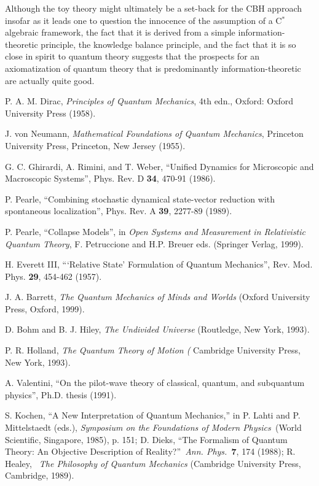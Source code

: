 \documentclass[pra,twocolumn,nofootinbib,showpacs]{revtex4}
\begin{document}
Although the toy theory might ultimately be a set-back for the CBH approach
insofar as it leads one to question the innocence of the assumption of a C$%
^{*}$ algebraic framework, the fact that it is derived from a simple
information-theoretic principle, the knowledge balance principle, and the
fact that it is so close in spirit to quantum theory suggests that the
prospects for an axiomatization of quantum theory that is predominantly
information-theoretic are actually quite good.

\begin{thebibliography}{99}
 P. A. M. Dirac, \textit{Principles of Quantum Mechanics},
4th edn., Oxford: Oxford University Press (1958).

 J. von Neumann, \textit{Mathematical Foundations of
Quantum Mechanics}, Princeton University Press, Princeton, New Jersey (1955).

 G. C. Ghirardi, A. Rimini, and T. Weber, ``Unified Dynamics
for Microscopic and Macroscopic Systems'', Phys. Rev. D \textbf{34}, 470-91
(1986).

 P. Pearle, ``Combining stochastic dynamical state-vector
reduction with spontaneous localization'', Phys. Rev. A \textbf{39}, 2277-89
(1989).

 P. Pearle, ``Collapse Models'', in \textit{Open Systems and
Measurement in Relativistic Quantum Theory}, F. Petruccione and H.P. Breuer
eds. (Springer Verlag, 1999).

 H. Everett III, ```Relative State' Formulation of Quantum
Mechanics'', Rev. Mod. Phys. \textbf{29}, 454-462 (1957).

 J. A. Barrett, \textit{The Quantum Mechanics of Minds and
Worlds} (Oxford University Press, Oxford, 1999).

 D. Bohm and B. J. Hiley, \textit{The Undivided Universe}
(Routledge, New York, 1993).

 P. R. Holland, \textit{The Quantum Theory of Motion (}%
Cambridge University Press, New York, 1993).

 A. Valentini, ``On the pilot-wave theory of classical,
quantum, and subquantum physics'', Ph.D. thesis (1991).

 S. Kochen, ``A New Interpretation of Quantum Mechanics,'' in
P. Lahti and P. Mittelstaedt (eds.), \textit{Symposium on the Foundations of
Modern Physics}\emph{\ }(World Scientific, Singapore, 1985), p. 151; D.
Dieks, ``The Formalism of Quantum Theory: An Objective Description of
Reality?''\textit{\ Ann. Phys.}\emph{\ }\textbf{7}, 174 (1988); R. Healey,%
\textit{\ The Philosophy of Quantum Mechanics }(Cambridge University Press,
Cambridge, 1989).


\end{thebibliography}
\end{document}
